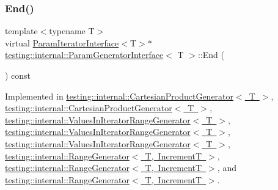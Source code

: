 \subsubsection{\texorpdfstring{End()}{End()}\hspace{0.1cm}{\footnotesize\ttfamily [2/3]}}
{\footnotesize\ttfamily template$<$typename T$>$ \\
virtual \mbox{\hyperlink{classtesting_1_1internal_1_1_param_iterator_interface}{Param\+Iterator\+Interface}}$<$T$>$$\ast$ \mbox{\hyperlink{classtesting_1_1internal_1_1_param_generator_interface}{testing\+::internal\+::\+Param\+Generator\+Interface}}$<$ T $>$\+::End (\begin{DoxyParamCaption}{ }\end{DoxyParamCaption}) const\hspace{0.3cm}{\ttfamily [pure virtual]}}



Implemented in \mbox{\hyperlink{classtesting_1_1internal_1_1_cartesian_product_generator_ae072dcf8400ac9dd5692e417262a664b}{testing\+::internal\+::\+Cartesian\+Product\+Generator$<$ T $>$}}, \mbox{\hyperlink{classtesting_1_1internal_1_1_cartesian_product_generator_ae072dcf8400ac9dd5692e417262a664b}{testing\+::internal\+::\+Cartesian\+Product\+Generator$<$ T $>$}}, \mbox{\hyperlink{classtesting_1_1internal_1_1_values_in_iterator_range_generator_a298cfb66a90b1a39c0cea3ca7ae1ece1}{testing\+::internal\+::\+Values\+In\+Iterator\+Range\+Generator$<$ T $>$}}, \mbox{\hyperlink{classtesting_1_1internal_1_1_values_in_iterator_range_generator_a298cfb66a90b1a39c0cea3ca7ae1ece1}{testing\+::internal\+::\+Values\+In\+Iterator\+Range\+Generator$<$ T $>$}}, \mbox{\hyperlink{classtesting_1_1internal_1_1_values_in_iterator_range_generator_a4af95b9eccfc86c40a715df2d9d0df40}{testing\+::internal\+::\+Values\+In\+Iterator\+Range\+Generator$<$ T $>$}}, \mbox{\hyperlink{classtesting_1_1internal_1_1_range_generator_ac112ca69567b9c47bf14554e0473e1e2}{testing\+::internal\+::\+Range\+Generator$<$ T, Increment\+T $>$}}, \mbox{\hyperlink{classtesting_1_1internal_1_1_range_generator_ac112ca69567b9c47bf14554e0473e1e2}{testing\+::internal\+::\+Range\+Generator$<$ T, Increment\+T $>$}}, and \mbox{\hyperlink{classtesting_1_1internal_1_1_range_generator_a8d2acbb733791a14df6e7bd3754e9003}{testing\+::internal\+::\+Range\+Generator$<$ T, Increment\+T $>$}}.

\mbox{\label{classtesting_1_1internal_1_1_param_generator_interface_afa7211b74990e11d3fc7ad4e7113da4f}} 
